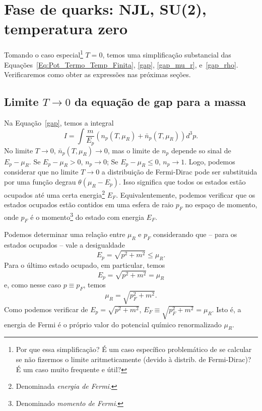 \section{Fase de quarks: NJL, SU(2), temperatura zero}

Tomando o caso especial\footnote{Por que essa simplificação? É um caso específico problemático de se calcular se não fizermos o limite aritmeticamente (devido à distrib. de Fermi-Dirac)? É um caso muito frequente e útil?} $T = 0$, temos uma simplificação substancial das Equações~\eqref{Eq:Pot_Termo_Temp_Finita}, \eqref{gap}, \eqref{gap_mu_r}, e~\eqref{gap_rho}. Verificaremos como obter as expressões nas próximas seções.

\subsection{Limite $T \to 0$ da equação de gap para a massa}

Na Equação~\eqref{gap}, temos a integral
\begin{equation}
	I = \int \frac{m}{E_p} (n_p(T, \mu_R) + \bar{n}_p(T, \mu_R)) d^3p.
\end{equation}
%
No limite $T \to 0$, $\bar{n}_p(T, \mu_R) \to 0$, mas o limite de $n_p$ depende so sinal de $E_p - \mu_R$. Se $E_p - \mu_R > 0$, $n_p \to 0$; Se $E_p - \mu_R \leqslant 0$, $n_p \to 1$. Logo, podemos considerar que no limite $T \to 0$ a distribuição de Fermi-Dirac pode ser substituida por uma função degrau $\theta(\mu_R - E_p)$. Isso significa que todos os estados estão ocupados até uma certa energia\footnote{Denominada \emph{energia de Fermi}.} $E_F$. Equivalentemente, podemos verificar que os estados ocupados estão contidos em uma esfera de raio $p_F$ no espaço de momento, onde $p_F$ é o momento\footnote{Denominado \emph{momento de Fermi}.} do estado com energia $E_F$. 

Podemos determinar uma relação entre $\mu_R$ e $p_F$ considerando que -- para os estados ocupados -- vale a desigualdade
\begin{equation}
	E_p = \sqrt{p^2 + m^2} \leqslant \mu_R.
\end{equation}
%
Para o último estado ocupado, em particular, temos
\begin{equation}
	E_p = \sqrt{p^2 + m^2} = \mu_R
\end{equation}
%
e, como nesse caso $p \equiv p_F$, temos
\begin{equation}
	\mu_R = \sqrt{p_F^2 + m^2}.
\end{equation}
%
Como podemos verificar de $E_p = \sqrt{p^2 + m^2}$, $E_F \equiv \sqrt{p_F^2 + m^2} = \mu_R$. Isto é, a energia de Fermi é o próprio valor do potencial químico renormalizado $\mu_R$.

